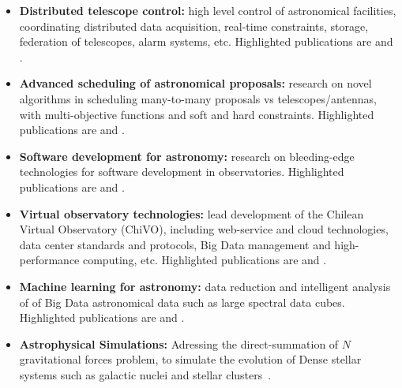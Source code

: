 \begin{itemize}
    \item \textbf{Distributed telescope control:}
        high level control of astronomical facilities, coordinating distributed
        data acquisition, real-time constraints, storage, federation of telescopes,
        alarm systems, etc. Highlighted publications are \cite{araya08:_acs_rt} and
        \cite{tobar08:_csat_gtcs}.

    \item \textbf{Advanced scheduling of astronomical proposals:}
        research on novel algorithms in scheduling many-to-many proposals vs
        telescopes/antennas, with multi-objective functions and soft and hard
        constraints. Highlighted publications are \cite{mmora10:_survey_aia_dpm}
        and \cite{mmora11:_solution_aia_dpm}.

    \item \textbf{Software development for astronomy:}
        research on bleeding-edge technologies for software development in
        observatories. Highlighted publications are
        \cite{cmaureir10:_hpc_data_trending} and
        \cite{ntroncoso10:_code_generation}.

    \item \textbf{Virtual observatory technologies:}
        lead development of the Chilean Virtual Observatory (ChiVO), including
        web-service and cloud technologies, data center standards and protocols,
        Big Data management and high-performance computing, etc.
        Highlighted publications are \cite{msolar2014:_chivo_manag} and
        \cite{jantogni2014:_nosql}.

    \item \textbf{Machine learning for astronomy:}
        data reduction and intelligent analysis of of Big Data astronomical data
        such as large spectral data cubes. Highlighted publications are
        \cite{rgregori:_classification_spie} and \cite{maray2014:_asydo}.

    \item \textbf{Astrophysical Simulations:}
        Adressing the direct-summation of $N$ gravitational forces problem,
        to simulate the evolution of Dense stellar systems such as galactic
        nuclei and stellar clusters~\cite{cmaureir14:gravidy}.
\end{itemize}
